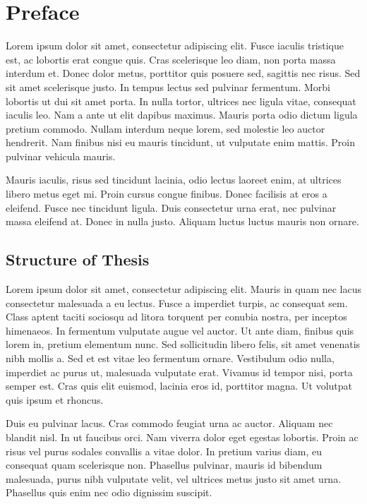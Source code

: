 \chapter*{Preface}\label{ch:preface}
Lorem ipsum dolor sit amet, consectetur adipiscing elit. Fusce iaculis
tristique est, ac lobortis erat congue quis. Cras scelerisque leo diam, non
porta massa interdum et. Donec dolor metus, porttitor quis posuere sed,
sagittis nec risus. Sed sit amet scelerisque justo. In tempus lectus sed
pulvinar fermentum. Morbi lobortis ut dui sit amet porta. In nulla tortor,
ultrices nec ligula vitae, consequat iaculis leo. Nam a ante ut elit dapibus
maximus. Mauris porta odio dictum ligula pretium commodo. Nullam interdum
neque lorem, sed molestie leo auctor hendrerit. Nam finibus nisi eu mauris
tincidunt, ut vulputate enim mattis. Proin pulvinar vehicula mauris.

Mauris iaculis, risus sed tincidunt lacinia, odio lectus laoreet enim, at
ultrices libero metus eget mi. Proin cursus congue finibus. Donec facilisis
at eros a eleifend. Fusce nec tincidunt ligula. Duis consectetur urna erat,
nec pulvinar massa eleifend at. Donec in nulla justo. Aliquam luctus luctus
mauris non ornare.

  \section*{Structure of Thesis}
    Lorem ipsum dolor sit amet, consectetur adipiscing elit. Mauris in quam nec
    lacus consectetur malesuada a eu lectus. Fusce a imperdiet turpis, ac
    consequat sem. Class aptent taciti sociosqu ad litora torquent per conubia
    nostra, per inceptos himenaeos. In fermentum vulputate augue vel auctor. Ut
    ante diam, finibus quis lorem in, pretium elementum nunc. Sed sollicitudin
    libero felis, sit amet venenatis nibh mollis a. Sed et est vitae leo
    fermentum ornare. Vestibulum odio nulla, imperdiet ac purus ut, malesuada
    vulputate erat. Vivamus id tempor nisi, porta semper est. Cras quis elit
    euismod, lacinia eros id, porttitor magna. Ut volutpat quis ipsum et
    rhoncus.

    Duis eu pulvinar lacus. Cras commodo feugiat urna ac auctor. Aliquam nec
    blandit nisl. In ut faucibus orci. Nam viverra dolor eget egestas lobortis.
    Proin ac risus vel purus sodales convallis a vitae dolor. In pretium varius
    diam, eu consequat quam scelerisque non. Phasellus pulvinar, mauris id
    bibendum malesuada, purus nibh vulputate velit, vel ultrices metus justo
    sit amet urna. Phasellus quis enim nec odio dignissim suscipit.

